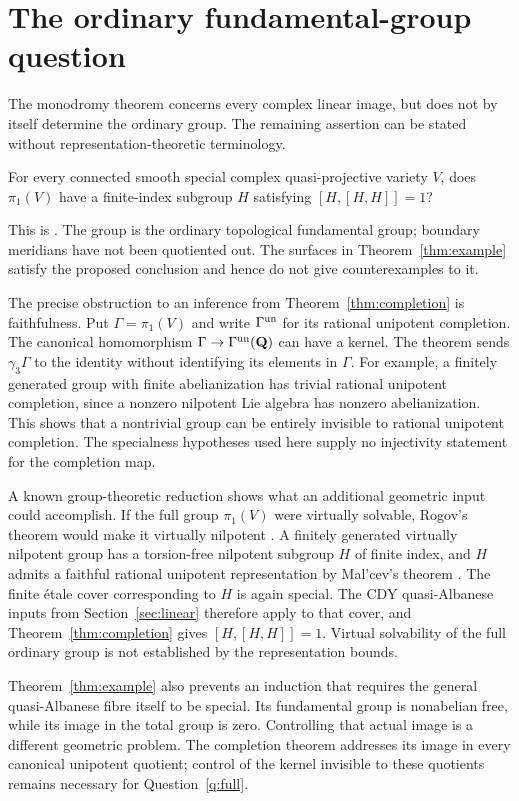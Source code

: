 \section{The ordinary fundamental-group question}\label{sec:ordinary}

The monodromy theorem concerns every complex linear image, but does
not by itself determine the ordinary group. The remaining assertion
can be stated without representation-theoretic terminology.

\begin{question}\label{q:full}
For every connected smooth special complex quasi-projective variety
$V$, does $\pi_1(V)$ have a finite-index subgroup $H$ satisfying
$[H,[H,H]]=1$?
\end{question}

This is \cite[Conjecture 2.12]{CDHP2026}. The group is the ordinary
topological fundamental group; boundary meridians have not been
quotiented out. The surfaces in Theorem~\ref{thm:example} satisfy the
proposed conclusion and hence do not give counterexamples to it.

The precise obstruction to an inference from Theorem~\ref{thm:completion}
is faithfulness. Put $\Gamma=\pi_1(V)$ and write $\Gamma^{\mathrm{un}}$ for
its rational unipotent completion. The canonical homomorphism
$\Gamma\to\Gamma^{\mathrm{un}}(\mathbf Q)$ can have a kernel. The theorem sends
$\gamma_3\Gamma$ to the identity without identifying its elements in
$\Gamma$. For example, a finitely generated group with finite
abelianization has trivial rational unipotent completion, since a
nonzero nilpotent Lie algebra has nonzero abelianization. This
shows that a nontrivial group can be entirely invisible to rational
unipotent completion. The specialness hypotheses used here supply no
injectivity statement for the completion map.

A known group-theoretic reduction shows what an additional geometric
input could accomplish. If the full group $\pi_1(V)$ were virtually
solvable, Rogov's theorem would make it virtually nilpotent
\cite[Theorem C, Corollary 6.6]{Rogov2025}. A finitely generated
virtually nilpotent group has a torsion-free nilpotent subgroup $H$ of
finite index, and $H$ admits a faithful rational unipotent
representation by Mal'cev's theorem
\cite[Chapters 1 and 5; Chapter 6, p.~100]{Segal1983}.
The finite \'etale cover corresponding to $H$ is again special. The CDY
quasi-Albanese inputs from Section~\ref{sec:linear} therefore apply to
that cover, and Theorem~\ref{thm:completion} gives $[H,[H,H]]=1$.
Virtual solvability of the full ordinary group is not established by
the representation bounds.

Theorem~\ref{thm:example} also prevents an induction that requires the
general quasi-Albanese fibre itself to be special. Its fundamental
group is nonabelian free, while its image in the total group is zero.
Controlling that actual image is a different geometric problem.
The completion theorem addresses its image in every canonical
unipotent quotient; control of the kernel invisible to these quotients
remains necessary for Question~\ref{q:full}.
